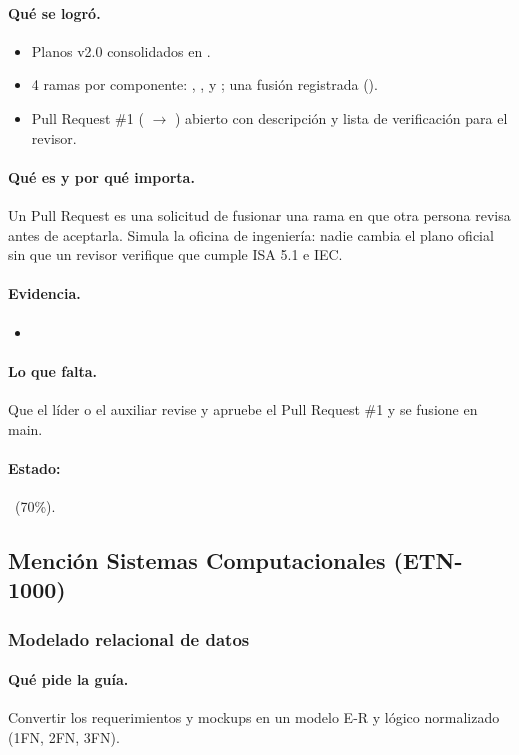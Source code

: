 \documentclass[a4paper,11pt]{article}
\begin{document}
\paragraph{Qué se logró.}
\begin{itemize}
\item Planos v2.0 consolidados en .
\item 4 ramas por componente: , ,  y ; una fusión registrada ().
\item Pull Request \#1 ( $\to$ ) abierto con descripción y lista de verificación para el revisor.
\end{itemize}
\paragraph{Qué es y por qué importa.} Un Pull Request es una solicitud de fusionar una rama en  que otra persona revisa antes de aceptarla. Simula la oficina de ingeniería: nadie cambia el plano oficial sin que un revisor verifique que cumple ISA 5.1 e IEC.
\paragraph{Evidencia.}
\begin{itemize}\small
\item {}
\end{itemize}
\paragraph{Lo que falta.} Que el líder o el auxiliar revise y apruebe el Pull Request \#1 y se fusione en main.
\paragraph{Estado:} \parcial~(70\%).
\subsection{Mención Sistemas Computacionales (ETN-1000)}
\subsubsection{Modelado relacional de datos}
\paragraph{Qué pide la guía.} Convertir los requerimientos y mockups en un modelo E-R y lógico normalizado (1FN, 2FN, 3FN).
\end{document}

